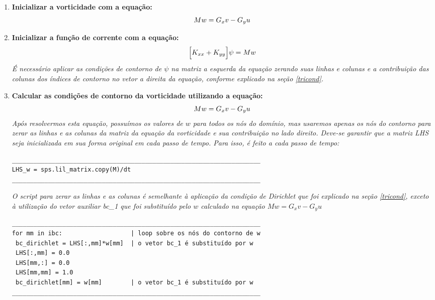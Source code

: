 \begin{enumerate}
 \item \textbf{Inicializar a vorticidade com a equação:}
 \begin{equation}
  Mw = G_{x}v - G_{y}u \notag
 \end{equation}

 \item \textbf{Inicializar a função de corrente com a equação:}
  \begin{equation}
  \Big[ K_{xx} + K_{yy} \Big] \psi = Mw \notag
  \end{equation}
  \textit{É necessário aplicar as condições de contorno de $\psi$ na matriz a esquerda da equação
  zerando suas linhas e colunas e a contribuição das colunas dos índices de contorno 
  no vetor a direita da equação, 
  conforme explicado na seção \ref{tricond}.}


 \item \textbf{Calcular as condições de contorno da vorticidade utilizando a equação:}
 \begin{equation}
  Mw = G_{x}v - G_{y}u \notag
 \end{equation}
 \textit{Após resolvermos esta equação, possuímos os valores de $w$ para todos
 os nós do domínio, mas usaremos apenas os nós do contorno
 para zerar as linhas e as colunas da matriz da equação da vorticidade 
 e sua contribuição no lado direito. Deve-se garantir que a matriz LHS 
 seja inicializada em sua forma original em cada passo de tempo. 
 Para isso, é feito a cada passo de tempo:}

\begin{verbatim}
_____________________________________________________________________
LHS_w = sps.lil_matrix.copy(M)/dt
_____________________________________________________________________
\end{verbatim}

 \textit{O script para zerar as linhas e as colunas é
 semelhante à aplicação da condição de Dirichlet
 que foi explicado na seção \ref{tricond},
 exceto à utilização do vetor auxiliar bc\_1 que
 foi substituído pelo $w$ calculado na
 equação $Mw = G_{x}v - G_{y}u$}

\begin{verbatim}
_____________________________________________________________________
for mm in ibc:                   | loop sobre os nós do contorno de w
 bc_dirichlet = LHS[:,mm]*w[mm]  | o vetor bc_1 é substituído por w
 LHS[:,mm] = 0.0                     
 LHS[mm,:] = 0.0                     
 LHS[mm,mm] = 1.0                    
 bc_dirichlet[mm] = w[mm]        | o vetor bc_1 é substituído por w
_____________________________________________________________________
\end{verbatim}


\end{enumerate}
